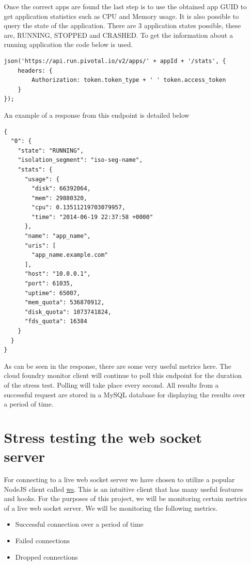 Once the correct apps are found the last step is to use the obtained app GUID to get application statistics such as CPU and Memory usage. It is also possible to query the state of the application. There are 3 application states possible, these are, RUNNING, STOPPED and CRASHED. To get the information about a running application the code below is used. 

\begin{verbatim}
json('https://api.run.pivotal.io/v2/apps/' + appId + '/stats', {
    headers: {
        Authorization: token.token_type + ' ' token.access_token
    }
});
\end{verbatim}

An example of a response from this endpoint is detailed below

\begin{verbatim}
{
  "0": {
    "state": "RUNNING",
    "isolation_segment": "iso-seg-name",
    "stats": {
      "usage": {
        "disk": 66392064,
        "mem": 29880320,
        "cpu": 0.13511219703079957,
        "time": "2014-06-19 22:37:58 +0000"
      },
      "name": "app_name",
      "uris": [
        "app_name.example.com"
      ],
      "host": "10.0.0.1",
      "port": 61035,
      "uptime": 65007,
      "mem_quota": 536870912,
      "disk_quota": 1073741824,
      "fds_quota": 16384
    }
  }
}
\end{verbatim}

As can be seen in the response, there are some very useful metrics here. The cloud foundry monitor client will continue to poll this endpoint for the duration of the stress test. Polling will take place every second. All results from a successful request are stored in a MySQL database for displaying the results over a period of time.

\section{Stress testing the web socket server}

For connecting to a live web socket server we have chosen to utilize a popular NodeJS client called \href{https://www.npmjs.com/package/ws}{ws}. This is an intuitive client that has many useful features and hooks. For the purposes of this project, we will be monitoring certain metrics of a live web socket server. We will be monitoring the following metrics.

\begin{itemize}
  \item Successful connection over a period of time
  \item Failed connections
  \item Dropped connections
\end{itemize}

